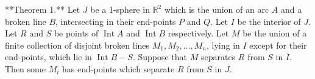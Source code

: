 **Theorem 1.** Let $J$ be a 1-sphere in $\mathbb{R}^2$ which is the union of an arc $A$ and a broken line $B$, intersecting in their end-points $P$ and $Q$. Let $I$ be the interior of $J$. Let $R$ and $S$ be points of $\operatorname{Int} A$ and $\operatorname{Int} B$ respectively. Let $M$ be the union of a finite collection of disjoint broken lines $M_1, M_2, \ldots, M_n$, lying in $I$ except for their end-points, which lie in $\operatorname{Int} B - S$. Suppose that $M$ separates $R$ from $S$ in $\overline{I}$. Then some $M_i$ has end-points which separate $R$ from $S$ in $J$.
